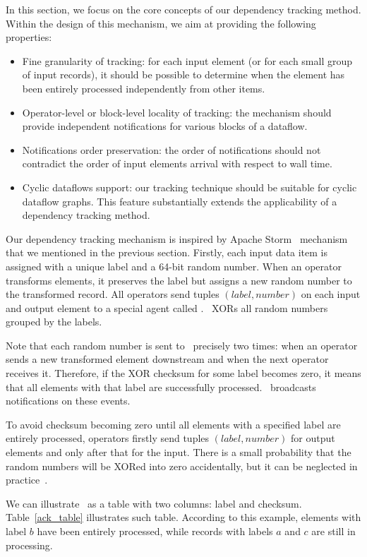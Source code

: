 \label{fs-acker-design}

In this section, we focus on the core concepts of our dependency tracking method. Within the design of this mechanism, we aim at providing the following properties:
\begin{itemize}
    \item Fine granularity of tracking: for each input element (or for each small group of input records), it should be possible to determine when the element has been entirely processed independently from other items.
    \item Operator-level or block-level locality of tracking: the mechanism should provide independent notifications for various blocks of a dataflow.
    \item Notifications order preservation: the order of notifications should not contradict the order of input elements arrival with respect to wall time.
    \item Cyclic dataflows support: our tracking technique should be suitable for cyclic dataflow graphs. This feature substantially extends the applicability of a dependency tracking method.
\end{itemize}

Our dependency tracking mechanism is inspired by Apache Storm \acker\ mechanism that we mentioned in the previous section. Firstly, each input data item is assigned with a unique label and a 64-bit random number. When an operator transforms elements, it preserves the label but assigns a new random number to the transformed record. All operators send tuples $(label, number)$ on each input and output element to a special agent called \acker . \acker\ XORs all random numbers grouped by the labels. 

Note that each random number is sent to \acker\ precisely two times: when an operator sends a new transformed element downstream and when the next operator receives it. Therefore, if the XOR checksum for some label becomes zero, it means that all elements with that label are successfully processed. \acker\ broadcasts notifications on these events.

To avoid checksum becoming zero until all elements with a specified label are entirely processed, operators firstly send tuples $(label, number)$ for output elements and only after that for the input. There is a small probability that the random numbers will be XORed into zero accidentally, but it can be neglected in practice~\cite{apache:storm:acker}.

We can illustrate \acker\ as a table with two columns: label and checksum. Table~\ref{ack_table} illustrates such table. According to this example, elements with label $b$ have been entirely processed, while records with labels $a$ and $c$ are still in processing.

